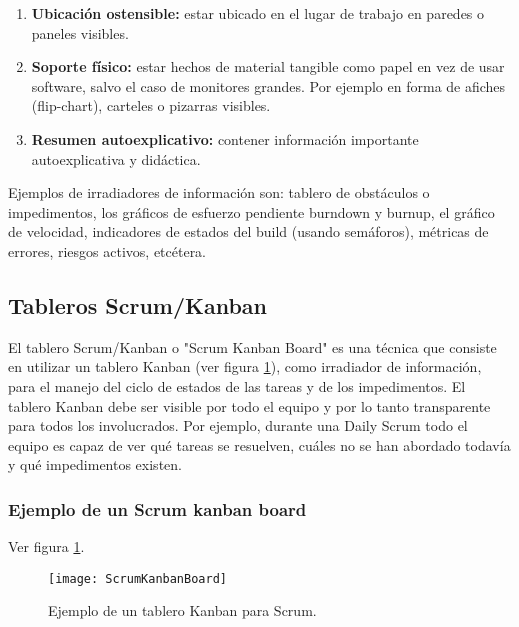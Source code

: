 \begin{enumerate}

\item \textbf{Ubicación ostensible:} estar ubicado en el lugar de trabajo en paredes o paneles visibles.

\item \textbf{Soporte físico:} estar hechos de material tangible como papel en vez de usar software, salvo el caso de monitores grandes. Por ejemplo en forma de afiches (flip-chart), carteles o pizarras visibles.

\item \textbf{Resumen autoexplicativo:} contener información importante autoexplicativa y didáctica.

\end{enumerate}

Ejemplos de irradiadores de información son: tablero de obstáculos o impedimentos, los gráficos de esfuerzo pendiente burndown y burnup, el gráfico de velocidad, indicadores de estados del build (usando semáforos), métricas de errores, riesgos activos, etcétera.

\subsection{Tableros Scrum/Kanban}

El tablero Scrum/Kanban o "Scrum Kanban Board" es una técnica que consiste en utilizar un tablero Kanban (ver figura \ref{fig:ScrumKanbanBoard}), como irradiador de información, para el manejo del ciclo de estados de las tareas y de los impedimentos. El tablero Kanban debe ser visible por todo el equipo y por lo tanto transparente para todos los involucrados. Por ejemplo, durante una Daily Scrum todo el equipo es capaz de ver qué tareas se resuelven, cuáles no se han abordado todavía y qué impedimentos existen.

\subsubsection{Ejemplo de un Scrum kanban board}

Ver figura \ref{fig:ScrumKanbanBoard}.

\begin{figure}[h]
  \centering
  \texttt{[image: ScrumKanbanBoard]}
  \caption{Ejemplo de un tablero Kanban para Scrum.}
  \centering
  \label{fig:ScrumKanbanBoard} %
\end{figure}

